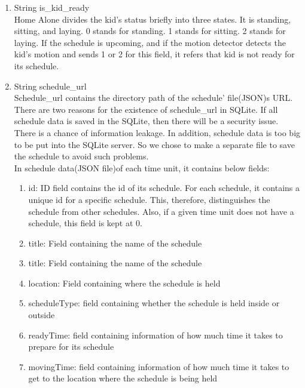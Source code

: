 \documentclass[conference]{IEEEtran}
\begin{document}
\begin{enumerate}[label=\arabic*.]
\begin{enumerate}[label=\arabic*.]
\begin{enumerate}[label=\alph*.]
        \item {\large{String is\_kid\_ready}} \\
        Home Alone divides the kid’s status briefly into three states. It is standing, sitting, and laying. 0 stands for standing. 1 stands for sitting. 2 stands for laying. If the schedule is upcoming, and if the motion detector detects the kid’s motion and sends 1 or 2 for this field, it refers that kid is not ready for its schedule. \\
        \item {\large{String schedule\_url}} \\
        Schedule\_url contains the directory path of the schedule’ file(JSON)s URL. There are two reasons for the existence of schedule\_url in SQLite. If all schedule data is saved in the SQLite, then there will be a security issue. There is a chance of information leakage. In addition, schedule data is too big to be put into the SQLite server. So we chose to make a separate file to save the schedule to avoid such problems. \\
        In schedule data(JSON file)of each time unit, it contains below fields: \\
        \begin{enumerate}[label=\roman*.]
            \item {\large{id: ID field contains the id of its schedule. For each schedule, it contains a unique id for a specific schedule. This, therefore, distinguishes the schedule from other schedules. Also, if a given time unit does not have a schedule, this field is kept at 0. }} \\
            \item {\large{title: Field containing the name of the schedule }} \\
            \item {\large{title: Field containing the name of the schedule }} \\
            \item {\large{location: Field containing where the schedule is held }} \\
            \item {\large{scheduleType: field containing whether the schedule is held inside or outside }} \\
            \item {\large{readyTime: field containing information of how much time it takes to prepare for its schedule }} \\
            \item {\large{movingTime: field containing information of how much time it takes to get to the location where the schedule is being held}} \\   

\end{enumerate}
\end{enumerate}
\end{enumerate}
\end{enumerate}
\end{document}
